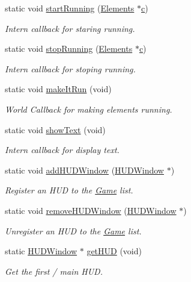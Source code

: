 \begin{DoxyCompactItemize}
static void \hyperlink{class_game_a27ad8f2a6f8f098cc28377df13c4ec2e}{start\-Running} (\hyperlink{class_elements}{Elements} $\ast$\hyperlink{jquery_8js_abce695e0af988ece0826d9ad59b8160d}{c})
\begin{DoxyCompactList}\small\item\em Intern callback for staring running. \end{DoxyCompactList}\item 
static void \hyperlink{class_game_a9394f6f0c90bde35fb0bd4ca3316c3f0}{stop\-Running} (\hyperlink{class_elements}{Elements} $\ast$\hyperlink{jquery_8js_abce695e0af988ece0826d9ad59b8160d}{c})
\begin{DoxyCompactList}\small\item\em Intern callback for stoping running. \end{DoxyCompactList}\item 
static void \hyperlink{class_game_ae763ecd953645a586b638a46b908ca5a}{make\-It\-Run} (void)
\begin{DoxyCompactList}\small\item\em World Callback for making elements running. \end{DoxyCompactList}\item 
static void \hyperlink{class_game_a5cf54b4cf9d8bf024f8936fedf11ccea}{show\-Text} (void)
\begin{DoxyCompactList}\small\item\em Intern callback for display text. \end{DoxyCompactList}\item 
static void \hyperlink{class_game_a88d713d54d9303c38c897635c7c04cf4}{add\-H\-U\-D\-Window} (\hyperlink{class_h_u_d_window}{H\-U\-D\-Window} $\ast$)
\begin{DoxyCompactList}\small\item\em Register an H\-U\-D to the \hyperlink{class_game}{Game} list. \end{DoxyCompactList}\item 
static void \hyperlink{class_game_a80e17eab80071411eff5eb38d6b7fc76}{remove\-H\-U\-D\-Window} (\hyperlink{class_h_u_d_window}{H\-U\-D\-Window} $\ast$)
\begin{DoxyCompactList}\small\item\em Unregister an H\-U\-D to the \hyperlink{class_game}{Game} list. \end{DoxyCompactList}\item 
static \hyperlink{class_h_u_d_window}{H\-U\-D\-Window} $\ast$ \hyperlink{class_game_a8339342d69fc241d349da9404ce088c5}{get\-H\-U\-D} (void)
\begin{DoxyCompactList}\small\item\em Get the first / main H\-U\-D. \end{DoxyCompactList}\end{DoxyCompactItemize}
